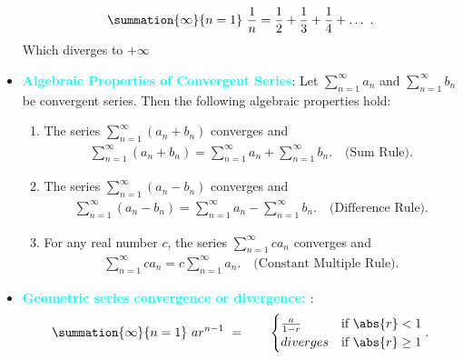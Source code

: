 \documentclass{report}
\begin{document}
\begin{itemize}
        \begin{align*}
            \summation{\infty}{n=1}\ \frac{1}{n}  =  \frac{1}{2} + \frac{1}{3} + \frac{1}{4} + \ldots\ 
        .\end{align*}
        Which diverges to $+\infty$
    \item \textbf{\textcolor{cyan}{Algebraic Properties of Convergent Series}}:
        Let $ \sum_{n=1}^{\infty} a_n$ and $\sum_{n=1}^{\infty} b_n$ be convergent series. Then the following algebraic properties hold:
        \begin{enumerate}
            \item The series 
                $\sum_{n=1}^{\infty} (a_n + b_n)$ converges and 
                \begin{align*}
                    \sum_{n=1}^{\infty} (a_n + b_n) = \sum_{n=1}^{\infty} a_n + \sum_{n=1}^{\infty} b_n. \quad \text{(Sum Rule)}
                .\end{align*}
            \item The series $\sum_{n=1}^{\infty} (a_n - b_n)$ converges and 
                \begin{align*}
                    \sum_{n=1}^{\infty} (a_n - b_n) = \sum_{n=1}^{\infty} a_n - \sum_{n=1}^{\infty} b_n. \quad \text{(Difference Rule)}
                .\end{align*}
            \item For any real number \( c \), the series $\sum_{n=1}^{\infty} c a_n$ converges and 
                \begin{align*}
                    \sum_{n=1}^{\infty} c a_n = c \sum_{n=1}^{\infty} a_n. \quad \text{(Constant Multiple Rule)}
                .\end{align*}
        \end{enumerate}

    \item \textbf{\textcolor{cyan}{Geometric series convergence or divergence: }}:
        \begin{align*}
            \summation{\infty}{n=1}\ ar^{n-1} \  = \quad \quad 
            \begin{cases}
                \frac{a}{1-r} & \text{if }  \abs{r} < 1\\
                diverges & \text{if }  \abs{r} \geq 1
            \end{cases}
        .\end{align*}


\end{itemize}
\end{document}
